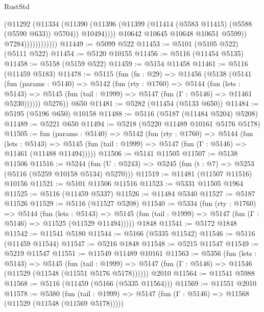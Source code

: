 \begin{lexlean}{RustStd}
\begin{coremodule}
{\begin{coremodule}
{{{{{{{{{{{{{{{{{{{{{{{{{{{{{{{                                (@11292
                                  (@11334
                                    (@11390
                                      (@11396
                                        (@11399 (@11414 (@5583 @11415) (@5588 (@5590 @633)) @5704))
                                        @10494))))
                                @10642
                                @10645
                                @10648
                                @10651
                                @5599))
                            @7284))))))))))))
@11449 := @5099 @522
@11453 := @5101 (@5105 @522) (@5111 @522)
@11454 := @5120 @10155
@11456 := @5116 (@11454 @5135)
@11458 := @5158 (@5159 @522)
@11459 := @5154 @11458
@11461 := @5116 (@11459 @5183)
@11478 := @5115
    (fun (fn : @29) =>
    @11456
      (@5138
        (@5141
          (fun (params : @5140) =>
          @5142
            (fun (rty : @1760) =>
            @5144
              (fun (lets : @5143) =>
              @5145 (fun (tail : @1999) => @5147 (fun (Γ : @5146) => @11461 @5230))))))
        @5276))
    @650
@11481 := @5282 (@11454 (@5133 @650))
@11484 := @5195 (@5196 @650) @10158
@11488 := @5116 (@5187 (@11484 @5204) @5208)
@11489 := @5221 @650
@11494 := @5218 (@5220 @11489 @10161 @5176 @5178)
@11505 := fun (params : @5140) =>
  @5142
    (fun (rty : @1760) =>
    @5144
      (fun (lets : @5143) =>
      @5145 (fun (tail : @1999) => @5147 (fun (Γ : @5146) => @11461 (@11488 @11494)))))
@11506 := @5141 @11505
@11507 := @5138 @11506
@11516 := @5244
    (fun (U : @5243) => @5245 (fun (t : @7) => @5253 (@5116 (@5259 @10158 @5134) @5270)))
@11519 := @11481 (@11507 @11516) @10156
@11521 := @5101 @11506 @11516
@11523 := @5331 @11505 @1964
@11525 := @5116 (@11459 @5337)
@11526 := @11484 @5340
@11527 := @5187 @11526
@11529 := @5116 (@11527 @5208)
@11540 := @5334
    (fun (rty : @1760) =>
    @5144
      (fun (lets : @5143) =>
      @5145 (fun (tail : @1999) => @5147 (fun (Γ : @5146) => @11525 (@11529 @11494)))))
    @1848
@11541 := @5172 @1848
@11542 := @11541 @5180
@11544 := @5166 (@5335 @11542)
@11546 := @5116 (@11459 @11544)
@11547 := @5216 @1848
@11548 := @5215 @11547
@11549 := @5219 @11547
@11551 := @11549 @11489 @10161
@11563 := @5356
    (fun (lets : @5143) =>
    @5145
      (fun (tail : @1999) =>
      @5147 (fun (Γ : @5146) => @11546 (@11529 (@11548 (@11551 @5176 @5178))))))
    @2010
@11564 := @11541 @5988
@11568 := @5116 (@11459 (@5166 (@5335 @11564)))
@11569 := @11551 @2010
@11578 := @5380
    (fun (tail : @1999) => @5147 (fun (Γ : @5146) => @11568 (@11529 (@11548 (@11569 @5178)))))
}}}}}}}}}}}}}}}}}}}}}}}}}}}}}}}
\end{coremodule}}
\end{coremodule}
\end{lexlean}
